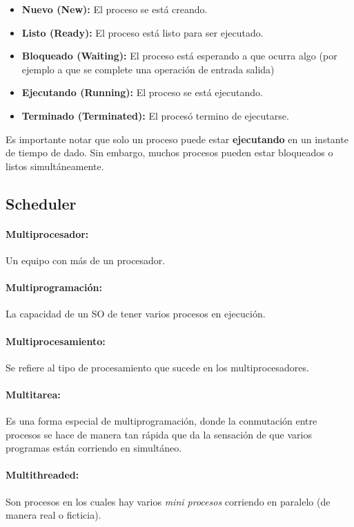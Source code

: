 \begin{itemize}
    \item \textbf{Nuevo (New):} El proceso se está creando.
    \item \textbf{Listo (Ready):} El proceso está listo para ser ejecutado.
    \item \textbf{Bloqueado (Waiting):} El proceso está esperando a que ocurra algo (por ejemplo a que se complete una operación de entrada salida)
    \item \textbf{Ejecutando (Running):} El proceso se está ejecutando.
    \item \textbf{Terminado (Terminated):} El procesó termino de ejecutarse.
\end{itemize}

Es importante notar que solo un proceso puede estar \textbf{ejecutando} en un instante de tiempo de dado. Sin embargo, muchos procesos pueden estar bloqueados o listos simultáneamente.

\subsection{Scheduler}
\paragraph{Multiprocesador:} Un equipo con más de un procesador.
\paragraph{Multiprogramación:} La capacidad de un SO de tener varios procesos en ejecución.
\paragraph{Multiprocesamiento:} Se refiere al tipo de procesamiento que sucede en los multiprocesadores.
\paragraph{Multitarea:} Es una forma especial de multiprogramación, donde la conmutación entre procesos se hace de manera tan rápida que da la sensación de que varios programas están corriendo en simultáneo.
\paragraph{Multithreaded:} Son procesos en los cuales hay varios \textit{mini procesos} corriendo en paralelo (de manera real o ficticia).

